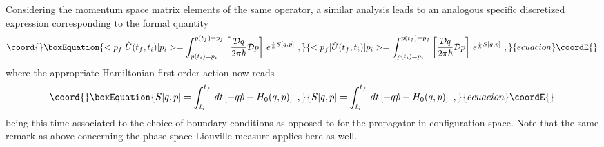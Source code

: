 \documentclass[a4paper,11pt]{article}
\begin{document}
Considering the momentum space matrix elements of the same
operator, a similar analysis leads to an analogous specific discretized
expression corresponding to the formal quantity
\begin{equation}\coord{}\boxEquation{
<p_f|\hat{U}(t_f,t_i)|p_i>=
\int_{p(t_i)=p_i}^{p(t_f)=p_f}
\left[\frac{{\cal D}q}{2\pi\hbar}{\cal D}p\right]\,
e^{\frac{i}{\hbar}S[q,p]}\ ,
\label{eq:formalPI2}
}{
<p_f|\hat{U}(t_f,t_i)|p_i>=
\int_{p(t_i)=p_i}^{p(t_f)=p_f}
\left[\frac{{\cal D}q}{2\pi\hbar}{\cal D}p\right]\,
e^{\frac{i}{\hbar}S[q,p]}\ ,
}{ecuacion}\coordE{}\end{equation}
where the appropriate Hamiltonian first-order action now reads
\begin{equation}\coord{}\boxEquation{
S[q,p]=\int_{t_i}^{t_f}\,dt\left[-q\dot{p}-H_0(q,p)\right]\ ,
}{
S[q,p]=\int_{t_i}^{t_f}\,dt\left[-q\dot{p}-H_0(q,p)\right]\ ,
}{ecuacion}\coordE{}\end{equation}
being this time associated to the choice of boundary conditions
\coordHE{} as opposed to \coordHE{} for the
propagator in configuration space. Note that the same remark as above
concerning the phase space Liouville measure applies here as well.
\end{document}
